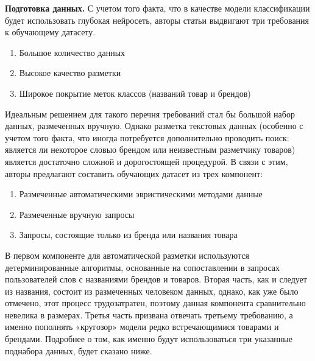 \documentclass[12pt,a4paper]{article}
\begin{document}
\textbf{Подготовка данных.} С учетом того факта, что в качестве модели классификации будет использовать глубокая нейросеть, авторы статьи выдвигают три требования к обучающему датасету.

\begin{enumerate}
    \item Большое количество данных
    \item Высокое качество разметки
    \item Широкое покрытие меток классов (названий товар и брендов)
\end{enumerate}

\noindent Идеальным решением для такого перечня требований стал бы большой набор данных, размеченных вручную. Однако разметка текстовых данных (особенно с учетом того факта, что иногда потребуется дополнительно проводить поиск: является ли некоторое словыо брендом или неизвестным разметчику товаров) является достаточно сложной и дорогостоящей процедурой. В связи с этим, авторы предлагают составить обучающих датасет из трех компонент:

\begin{enumerate}
    \item Размеченные автоматическими эвристическими методами данные
    \item Размеченные вручную запросы
    \item Запросы, состоящие только из бренда или названия товара
\end{enumerate}

\noindent В первом компоненте для автоматической разметки используются детерминированные алгоритмы, основанные на сопоставлении в запросах пользователей слов с названиями брендов и товаров. Вторая часть, как и следует из названия, состоит из размеченных человеком данных, однако, как уже было отмечено, этот процесс трудозатратен, поэтому данная компонента сравнительно невелика в размерах. Третья часть призвана отвечать третьему требованию, а именно пополнять «кругозор» модели редко встречающимися товарами и брендами. Подробнее о том, как именно будут использоваться три указанные поднабора данных, будет сказано ниже.
\end{document}
